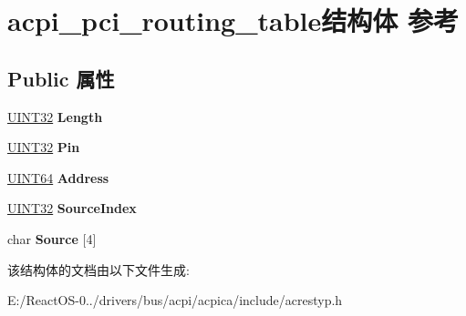 \hypertarget{structacpi__pci__routing__table}{}\section{acpi\+\_\+pci\+\_\+routing\+\_\+table结构体 参考}
\label{structacpi__pci__routing__table}
\subsection*{Public 属性}
\begin{DoxyCompactItemize}
\item 
\mbox{\label{structacpi__pci__routing__table_a8eea02b7eed51ecea8882790c4ef7311}} 
\hyperlink{_processor_bind_8h_ae1e6edbbc26d6fbc71a90190d0266018}{U\+I\+N\+T32} {\bfseries Length}
\item 
\mbox{\label{structacpi__pci__routing__table_aba8dba5e647e85dce666b49f42f214ad}} 
\hyperlink{_processor_bind_8h_ae1e6edbbc26d6fbc71a90190d0266018}{U\+I\+N\+T32} {\bfseries Pin}
\item 
\mbox{\label{structacpi__pci__routing__table_a4e9f80f7b56bac1336f559bda8d5b41f}} 
\hyperlink{_processor_bind_8h_a57be03562867144161c1bfee95ca8f7c}{U\+I\+N\+T64} {\bfseries Address}
\item 
\mbox{\label{structacpi__pci__routing__table_aeca3133d78c6c430b76bd39a2e5875cd}} 
\hyperlink{_processor_bind_8h_ae1e6edbbc26d6fbc71a90190d0266018}{U\+I\+N\+T32} {\bfseries Source\+Index}
\item 
\mbox{\label{structacpi__pci__routing__table_a6b26a0749451d367d155fd3a2129406b}} 
char {\bfseries Source} \mbox{[}4\mbox{]}
\end{DoxyCompactItemize}


该结构体的文档由以下文件生成\+:\begin{DoxyCompactItemize}
\item 
E\+:/\+React\+O\+S-\/0../drivers/bus/acpi/acpica/include/acrestyp.\+h\end{DoxyCompactItemize}
